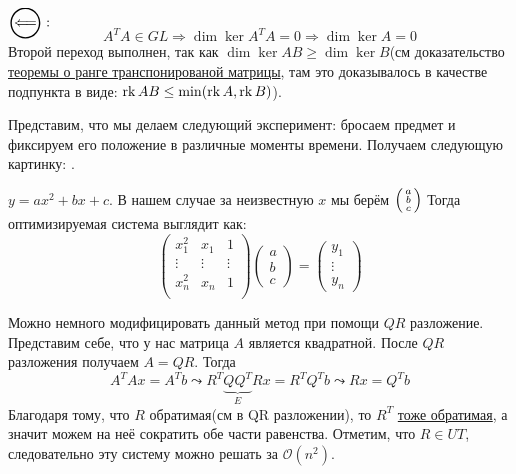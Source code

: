 $\ola:$\\
\[
    A^T A \in GL \Rightarrow \dim \ker A^T A = 0 \Rightarrow \dim \ker A = 0
\]
Второй переход выполнен, так как $\dim \ker AB \ge \dim \ker B$(см доказательство
\hyperref[thm:О ранге транспонированной матрицы]{теоремы о ранге транспонированой матрицы},
там это доказывалось в качестве подпункта в виде: $\operatorname{rk} AB \le \min(\operatorname{rk} A, \operatorname{rk} B)$).

\begin{example}
Представим, что мы делаем следующий эксперимент: бросаем предмет
и фиксируем его положение в различные моменты времени. Получаем
следующую картинку: .

$y= ax^2 + bx + c$.
В нашем случае за неизвестную $x$ мы берём $
\begin{psmallmatrix}
    a\\ b\\ c
\end{psmallmatrix}$
Тогда оптимизируемая система выглядит как:
\[
    \begin{pmatrix}
        x_1^2 & x_1 & 1\\
        \vdots & \vdots & \vdots\\
        x_n^2 & x_n & 1\\
    \end{pmatrix}
    \begin{pmatrix}
        a \\ b \\ c
    \end{pmatrix} 
    =
    \begin{pmatrix}
        y_1\\ \vdots \\ y_n
\end{pmatrix}
\]
\end{example}

Можно немного модифицировать данный метод при помощи $QR$ разложение.
Представим себе, что у нас матрица $A$ является квадратной. После $QR$ разложения
получаем  $A = QR$.
Тогда
\[
   A^T A x = A^T b \leadsto R^T \underbrace{Q Q^T}_{E} Rx = R^T Q^Tb \leadsto
   Rx = Q^Tb
\]
Благодаря тому, что $R$ обратимая(см в QR разложении), то $R^T$ 
\hyperref[thm:О ранге транспонированной матрицы]{тоже обратимая},
а значит можем на неё сократить обе части равенства.
Отметим, что $R\in UT$, следовательно эту систему можно решать за $\mathcal{O}(n^2)$.
